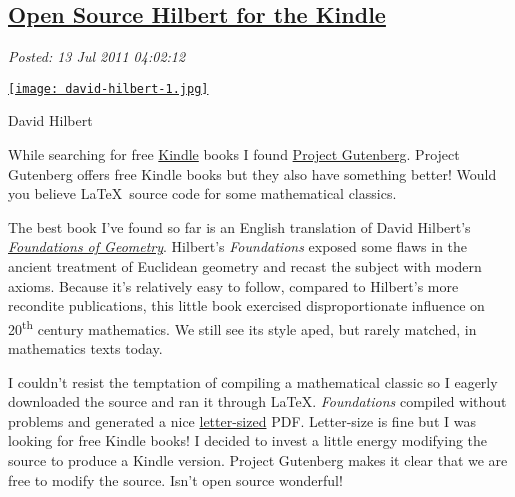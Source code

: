 %

\subsection*{\href{http://bakerjd99.wordpress.com/2011/07/12/open-source-hilbert-for-the-kindle/}{Open Source Hilbert for the Kindle}}


\noindent\emph{Posted: 13 Jul 2011 04:02:12}
\vspace{6pt}


\captionsetup[floatingfigure]{labelformat=empty}
\begin{floatingfigure}[l]{0.24\textwidth}
\centering
\href{http://www.nndb.com/people/735/000087474/}{\texttt{[image: david-hilbert-1.jpg]}}
\caption{David  Hilbert}
\label{fig:1463X0}
\end{floatingfigure}While searching for free
\href{http://www.amazon.com/Kindle-Wireless-Reader-Wifi-Graphite/dp/B002Y27P3M}{Kindle}
books I found \href{http://www.gutenberg.org/wiki/Main\_Page}{Project
Gutenberg}. Project Gutenberg offers free Kindle books but they also
have something better! Would you believe \LaTeX\ source code for
some mathematical classics.

The best book I've found so far is an English translation of David
Hilbert's \href{http://www.gutenberg.org/ebooks/17384}{\emph{Foundations
of Geometry}}. Hilbert's \emph{Foundations} exposed some flaws in the
ancient treatment of Euclidean geometry and recast the subject with
modern axioms. Because it's relatively easy to follow, compared to
Hilbert's more recondite publications, this little book exercised
disproportionate influence on 20\textsuperscript{th} century mathematics. We still see its
style aped, but rarely matched, in mathematics texts today.

I couldn't resist the temptation of compiling a mathematical classic so
I eagerly downloaded the source and ran it through \LaTeX.
\emph{Foundations} compiled without problems and generated a nice
\href{http://en.wikipedia.org/wiki/Letter\_(paper\_size)}{letter-sized}
PDF. Letter-size is fine but I was looking for free Kindle books! I
decided to invest a little energy modifying the source to produce a
Kindle version. Project Gutenberg makes it clear that we are free to
modify the source. Isn't open source wonderful!

